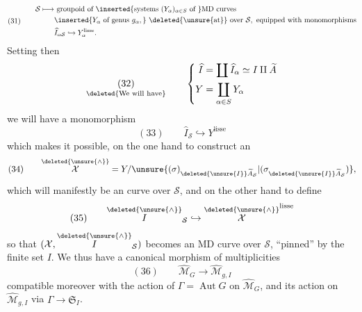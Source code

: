 \[
(31)\qquad\begin{aligned}
\mathcal S\longmapsto&\ \text{groupoid of }\inserted{\text{systems }(Y_\alpha)_{\alpha\in S}\text{ of }}\text{MD curves}\\
&\inserted{Y_\alpha\text{ of genus }g_\alpha,}\ \text{\deleted{\unsure{at}} over }\mathcal S,\text{ equipped with monomorphisms}\\
&\widehat I_{\alpha\mathcal S}\hookrightarrow Y_\alpha^{\text{lisse}}.
\end{aligned}
\]
Setting then
\[
\underset{\text{\deleted{We will have}}}{(32)}\qquad\left\{\begin{aligned}
\widehat I&=\coprod\widehat I_\alpha\simeq I\amalg\widetilde A\\
Y&=\coprod_{\alpha\in S}Y_\alpha
\end{aligned}\right.
\]
we will have a monomorphism
\[
(33)\qquad\widehat I_{\mathcal S}\hookrightarrow Y^{\text{lisse}}
\]
which makes it possible, on the one hand to construct an
\[
(34)\qquad\overset{\deleted{\unsure{\wedge}}}{\mathcal X}=Y/\unsure{(\sigma)_{\deleted{\unsure{I}}\widetilde A_{\mathcal S}}|(\sigma_{\deleted{\unsure{I}}\widetilde A_{\mathcal S}})},
\]
which will manifestly be an  curve over $\mathcal S$, and on the other hand to define
\[
(35)\qquad\overset{\deleted{\unsure{\wedge}}}{I}_{\mathcal S}\hookrightarrow\overset{\deleted{\unsure{\wedge}}}{\mathcal X}^{\text{lisse}}
\]
so that $(\mathcal X,\overset{\deleted{\unsure{\wedge}}}{I}_{\mathcal S})$ becomes an MD curve  over $\mathcal S$, ``pinned'' by the finite set $I$. We thus have a canonical morphism of multiplicities
\[
(36)\qquad\widehat{\mathcal M}_G\longrightarrow\widehat{\mathcal M}_{g,I}
\]
compatible moreover with the action of $\Gamma=\operatorname{Aut}G$ on $\widehat{\mathcal M}_G$, and its action on $\widehat{\mathcal M}_{g,I}$ via $\Gamma\to\mathfrak S_I$.
